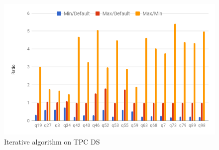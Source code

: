 \begin{figure}[h]
	\includegraphics[width=\linewidth]{fig/tpcds-iterative.png}
	\caption{Iterative algorithm on TPC DS\protect\footnotemark[1]}
	\label{fig:iterativetpcds}
\end{figure}


